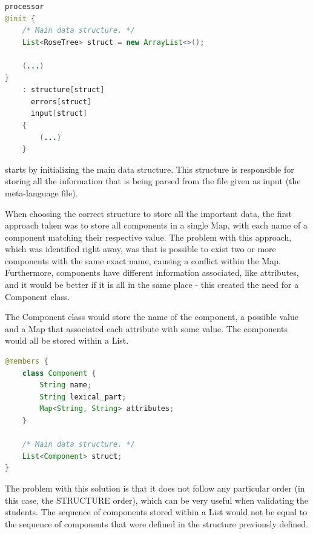 \begin{center}
\begin{minipage}{11cm}
\begin{lstlisting}[language=java, basicstyle=\small, label={lst:processor}, caption=Processor rule from the meta-grammar]
processor
@init {
    /* Main data structure. */
    List<RoseTree> struct = new ArrayList<>();

    (...)
}
    : structure[struct]
      errors[struct]
      input[struct]
    {
        (...)
    }
\end{lstlisting}
\end{minipage}
\end{center}

\noindent starts by initializing the main data structure. This structure is responsible for storing all the information that is being parsed from the file given as input (the meta-language file). 

When choosing the correct structure to store all the important data, the first \/\*approach\*\/ taken was to store all components in a single Map, with each name of a component
matching their respective value. The problem with this approach, which was identified right away, was that is possible to exist two or more components with the same exact
name, causing a conflict within the Map. Furthermore, components have different information associated, like attributes, and it would be better if it is all in the same
place - this created the need for a Component class.

The Component class would store the name of the component, a possible value and a Map that associated each attribute with some value. The components would all be stored
within a List.

\begin{center}
\begin{minipage}{10cm}
\begin{lstlisting}[language=java, basicstyle=\small, label={lst:component_class}, caption=Component class]
@members {
    class Component {
        String name;
        String lexical_part;
        Map<String, String> attributes;
    }

    /* Main data structure. */
    List<Component> struct;
}
\end{lstlisting}
\end{minipage}
\end{center}

The problem with this solution is that it does not follow any particular order (in this case, the STRUCTURE order), which can be very useful when validating the students.
The sequence of components stored within a List would not be equal to the sequence of components that were defined in the structure previously defined.


